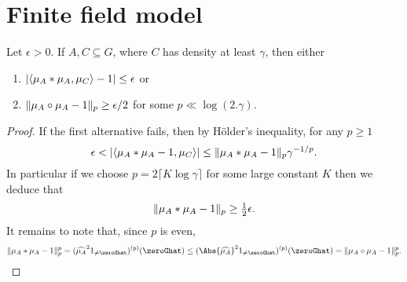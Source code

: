 \chapter{Finite field model}

\begin{lemma}\label{global_dichotomy}
Let $\epsilon >0$. If $A,C\subseteq G$, where $C$ has density at least $\gamma$, then either
\begin{enumerate}
\item  $\left\lvert \langle \mu_A\ast \mu_A,\mu_C\rangle -1\right\rvert\leq \epsilon$ or
\item $\lVert \mu_A\circ \mu_A-1\rVert_p \geq \epsilon/2$ for some $p\ll\log(2.\gamma)$.
\end{enumerate}
\end{lemma}
\begin{proof}
If the first alternative fails, then by H\"{o}lder's inequality, for any $p\geq 1$
\[\epsilon < \left\lvert  \langle \mu_A \ast \mu_A - 1, \mu_C \rangle \right\rvert \leq \lVert \mu_A\ast \mu_A-1\rVert_p\gamma^{-1/p}.\]
In particular if we choose $p=2\lceil K\log{\gamma}\rceil$ for some large constant $K$ then we deduce that
\[\lVert \mu_A\ast \mu_A-1\rVert_{p}\geq \tfrac{1}{2}\epsilon.\]
It remains to note that, since $p$ is even,
\[\norm{\mu_A\ast \mu_A-1}_{p}^p=(\widehat{\mu_A}^2\ind{\neq \zeroGhat})^{(p)}(\zeroGhat)\leq(\Abs{\widehat{\mu_A}}^2\ind{\neq \zeroGhat})^{(p)}(\zeroGhat)=\norm{\mu_A\circ \mu_A-1}_p^p. \qedhere \]
\end{proof}


